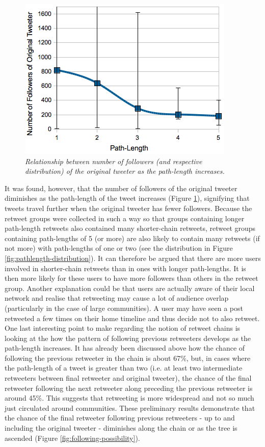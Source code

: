 \begin{figure}[h]
\includegraphics[scale=0.6]{4.Chapter1/Media/originalfollowers-pathlength-distribution.png} 
\caption{\textit{Relationship between number of followers (and respective distribution) of the original tweeter as the path-length increases.}}
\label{fig:originalfollowers-pathlength}
\end{figure}
It was found, however, that the number of followers of the original tweeter diminishes as the path-length of the tweet increases (Figure \ref{fig:originalfollowers-pathlength}), signifying that tweets travel further when the original tweeter has fewer followers. Because the retweet groups were collected in such a way so that groups containing longer path-length retweets also contained many shorter-chain retweets, retweet groups containing path-lengths of 5 (or more) are also likely to contain many retweets (if not more) with path-lengths of one or two (see the distribution in Figure \ref{fig:pathlength-distribution}). It can therefore be argued that there are more users involved in shorter-chain retweets than in ones with longer path-lengths. It is then more likely for these users to have more followers than others in the retweet group. Another explanation could be that users are actually aware of their local network and realise that retweeting may cause a lot of audience overlap (particularly in the case of large communities). A user may have seen a post retweeted a few times on their home timeline and thus decide not to also retweet.\\
One last interesting point to make regarding the notion of retweet chains is looking at the how the pattern of following previous retweeters develops as the path-length increases. It has already been discussed above how the chance of following the previous retweeter in the chain is about 67\%, but, in cases where the path-length of a tweet is greater than two (i.e. at least two intermediate retweeters between final retweeter and original tweeter), the chance of the final retweeter following the next retweeter along preceding the previous retweeter is around 45\%. This suggests that retweeting is more widespread and not so much just circulated around communities. These preliminary results demonstrate that the chance of the final retweeter following previous retweeters - up to and including the original tweeter - diminishes along the chain or as the tree is ascended (Figure \ref{fig:following-possibility}).\\
